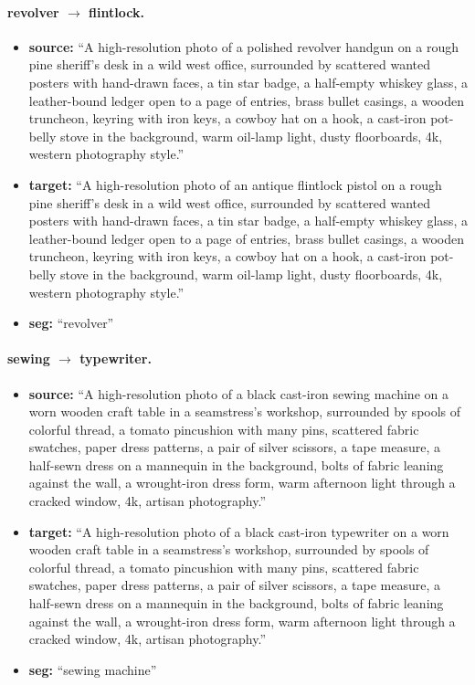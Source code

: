 \paragraph{revolver $\to$ flintlock.}
\begin{itemize}
    \item \textbf{source:} ``A high-resolution photo of a polished revolver handgun on a rough pine sheriff's desk in a wild west office, surrounded by scattered wanted posters with hand-drawn faces, a tin star badge, a half-empty whiskey glass, a leather-bound ledger open to a page of entries, brass bullet casings, a wooden truncheon, keyring with iron keys, a cowboy hat on a hook, a cast-iron pot-belly stove in the background, warm oil-lamp light, dusty floorboards, 4k, western photography style.''
    \item \textbf{target:} ``A high-resolution photo of an antique flintlock pistol on a rough pine sheriff's desk in a wild west office, surrounded by scattered wanted posters with hand-drawn faces, a tin star badge, a half-empty whiskey glass, a leather-bound ledger open to a page of entries, brass bullet casings, a wooden truncheon, keyring with iron keys, a cowboy hat on a hook, a cast-iron pot-belly stove in the background, warm oil-lamp light, dusty floorboards, 4k, western photography style.''
    \item \textbf{seg:} ``revolver''
\end{itemize}

\paragraph{sewing $\to$ typewriter.}
\begin{itemize}
    \item \textbf{source:} ``A high-resolution photo of a black cast-iron sewing machine on a worn wooden craft table in a seamstress's workshop, surrounded by spools of colorful thread, a tomato pincushion with many pins, scattered fabric swatches, paper dress patterns, a pair of silver scissors, a tape measure, a half-sewn dress on a mannequin in the background, bolts of fabric leaning against the wall, a wrought-iron dress form, warm afternoon light through a cracked window, 4k, artisan photography.''
    \item \textbf{target:} ``A high-resolution photo of a black cast-iron typewriter on a worn wooden craft table in a seamstress's workshop, surrounded by spools of colorful thread, a tomato pincushion with many pins, scattered fabric swatches, paper dress patterns, a pair of silver scissors, a tape measure, a half-sewn dress on a mannequin in the background, bolts of fabric leaning against the wall, a wrought-iron dress form, warm afternoon light through a cracked window, 4k, artisan photography.''
    \item \textbf{seg:} ``sewing machine''
\end{itemize}

